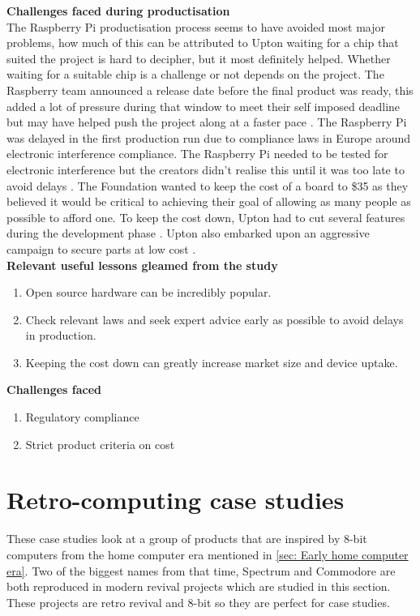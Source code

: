 \textbf{Challenges faced during productisation}\\
The Raspberry Pi productisation process seems to have avoided most major problems, how much of this can be attributed to Upton waiting for a chip that suited the project is hard to decipher, but it most definitely helped. Whether waiting for a suitable chip is a challenge or not depends on the project.
The Raspberry team announced a release date before the final product was ready, this added a lot of pressure during that window to meet their self imposed deadline but may have helped push the project along at a faster pace 
\cite{RN97}. 
The Raspberry Pi was delayed in the first production run due to compliance laws in Europe around electronic interference compliance. The Raspberry Pi needed to be tested for electronic interference but the creators didn't realise this until it was too late to avoid delays 
\cite{RN98}. The Foundation wanted to keep the cost of a board to \$35 as they believed it would be critical to achieving their goal of allowing as many people as possible to afford one. To keep the cost down, Upton had to cut several features during the development phase 
\cite{RN98}. Upton also embarked upon an aggressive campaign to secure parts at low cost 
\cite{RN98}.\\

\textbf{Relevant useful lessons gleamed from the study}
\begin{enumerate}
\item Open source hardware can be incredibly popular. 
\item Check relevant laws and seek expert advice early as possible to avoid delays in production.
\item Keeping the cost down can greatly increase market size and device uptake. \\
\end{enumerate}

\textbf{Challenges faced}
\begin{enumerate}
\item Regulatory compliance
\item Strict product criteria on cost
\end{enumerate}

\section{Retro-computing case studies}
These case studies look at a group of products that are inspired by 8-bit computers from the home computer era mentioned in \ref{sec: Early home computer era}. Two of the biggest names from that time, Spectrum and Commodore are both reproduced in modern revival projects which are studied in this section. These projects are retro revival and 8-bit so they are perfect for case studies.

